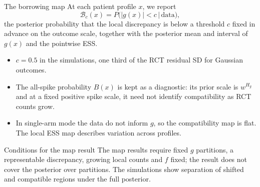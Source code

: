 \documentclass[11pt,aspectratio=169]{beamer}
\newcommand{\given}{\,\vert\,}
\begin{document}
\begin{frame}{The borrowing map}
  \footnotesize
  At each patient profile $x$, we report
  \[
    \mathcal B_c(x)=P\bigl(|g(x)|<c\given\text{data}\bigr),
  \]
  the posterior probability that the local discrepancy is below a threshold $c$ fixed in advance on the outcome scale, together with the posterior mean and interval of $g(x)$ and the pointwise ESS.
  \begin{itemize}
    \item $c=0.5$ in the simulations, one third of the RCT residual SD for Gaussian outcomes.
    \item The all-spike probability $B(x)$ is kept as a diagnostic: its prior scale is $w^{H_g}$ and at a fixed positive spike scale, it need not identify compatibility as RCT counts grow.
    \item In single-arm mode the data do not inform $g$, so the compatibility map is flat. The local ESS map describes variation across profiles.
  \end{itemize}
  \begin{alertblock}{Conditions for the map result}
    The map results require fixed $g$ partitions, a representable discrepancy, growing local counts and $f$ fixed; the result does not cover the posterior over partitions. The simulations show separation of shifted and compatible regions under the full posterior.
  \end{alertblock}
\end{frame}
\end{document}
